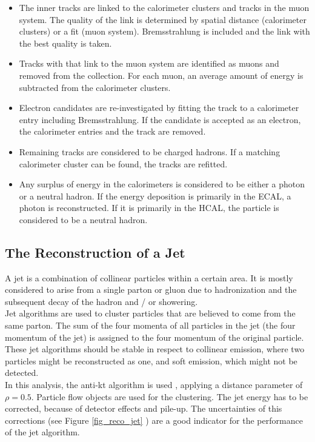 \begin{itemize}
\item The inner tracks are linked to the calorimeter clusters and tracks in the muon system. The quality of the link is determined by spatial distance (calorimeter clusters) or a fit (muon system). Bremsstrahlung is included and the link with the best quality is taken.
\item Tracks with that link to the muon system are identified as muons and removed from the collection. For each muon, an average amount of energy is subtracted from the calorimeter clusters.
\item Electron candidates are re-investigated by fitting the track to a calorimeter entry including Bremsstrahlung. If the candidate is accepted as an electron, the calorimeter entries and the track are removed.
\item Remaining tracks are considered to be charged hadrons. If a matching calorimeter cluster can be found, the tracks are refitted.
\item Any surplus of energy in the calorimeters is considered to be either a photon or a neutral hadron. If the energy deposition is primarily in the ECAL, a photon is reconstructed. If it is primarily in the HCAL, the particle is considered to be a neutral hadron.
\end{itemize}

\subsection{The Reconstruction of a Jet}
\label{sec_reco_jet}

A jet is a combination of collinear particles within a certain area. It is mostly considered to arise from a single parton or gluon due to hadronization and the subsequent decay of the hadron and / or showering. \\
Jet algorithms are used to cluster particles that are believed to come from the same parton. The sum of the four momenta of all particles in the jet (the four momentum of the jet) is assigned to the four momentum of the original particle. \\
These jet algorithms should be stable in respect to collinear emission, where two particles might be reconstructed as one, and soft emission, which might not be detected. \\
In this analysis, the anti-kt algorithm is used \cite{Cacciari:2008gp}, applying a distance parameter of $\rho = 0.5$. Particle flow objects are used for the clustering. The jet energy has to be corrected, because of detector effects and pile-up. The uncertainties of this corrections (see Figure \ref{fig_reco_jet} ) are a good indicator for the performance of the jet algorithm.\\

